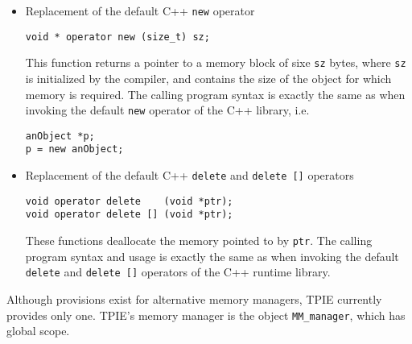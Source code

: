 \begin{itemize}
\item Replacement of the default C++ \verb|new| operator
\begin{verbatim}
void * operator new (size_t) sz;
\end{verbatim}
This function returns a pointer to a memory block of sixe
\verb|sz| bytes, where \verb|sz| is initialized by the
compiler, and contains the size of the object
for which memory is required. The calling program syntax is
exactly the same as when invoking the default \verb|new|
operator of the C++ library, i.e. 

\begin{verbatim}
anObject *p;
p = new anObject; 
\end{verbatim}

\item Replacement of the default C++ \verb|delete| and
\verb|delete []| operators
\begin{verbatim}
void operator delete    (void *ptr);
void operator delete [] (void *ptr);
\end{verbatim}

These functions deallocate the memory pointed to by
\verb|ptr|. The calling program syntax and usage is exactly
the same as when invoking the default \verb|delete| and
\verb|delete []| operators of the C++ runtime library.

\end{itemize}

Although provisions exist for alternative memory managers,
TPIE currently provides only one. TPIE's memory manager is the object
\verb|MM_manager|, which has global scope. 

